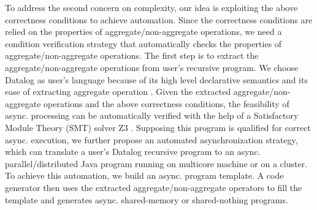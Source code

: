 
To address the second concern on complexity, our idea is exploiting the above correctness conditions to achieve automation. Since the correctness conditions are relied on the properties of aggregate/non-aggregate operations, we need a condition verification strategy that automatically checks the properties of aggregate/non-aggregate operations. The first step is to extract the aggregate/non-aggregate operations from user's recursive program. We choose Datalog \cite{} as user's language because of its high level declarative semantics and its ease of extracting aggregate operation \cite{Shkapsky:2016:BDA:2882903.2915229}. Given the extracted aggregate/non-aggregate operations and the above correctness conditions, the feasibility of async. processing can be automatically verified with the help of a Satisfactory Module Theory (SMT) solver Z3 \cite{DeMoura:2008:ZES:1792734.1792766}. Supposing this program is qualified for correct async. execution, we further propose an automated asynchronization strategy, which can translate a user's Datalog recursive program to an async. parallel/distributed Java program running on multicore machine or on a cluster. To achieve this automation, we build an async. program template. A code generator then uses the extracted aggregate/non-aggregate operators to fill the template and generates async. shared-memory or shared-nothing programs.





